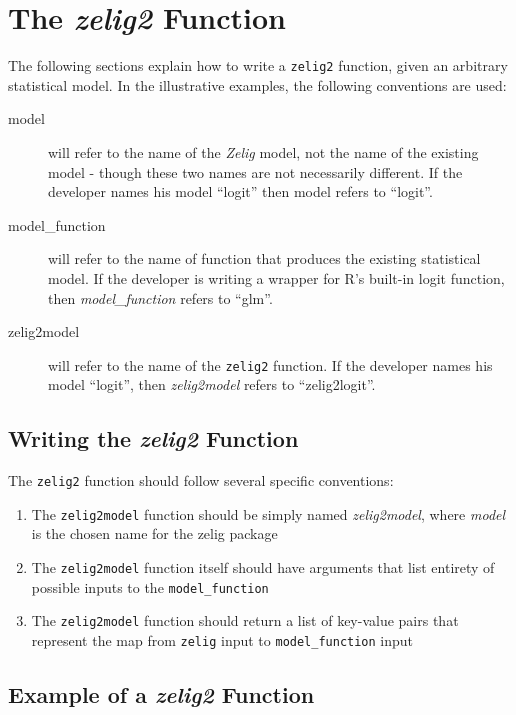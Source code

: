 \documentclass[11pt]{article}
\begin{document}
\section{The \emph{zelig2} Function}
The following sections explain how to write a {\tt zelig2} function, given an arbitrary statistical model.  In the illustrative examples, the following conventions are used:

\begin{description}
	\item[model]{will refer to the name of the \emph{Zelig} model, not the name of the existing model - though these two names are not necessarily different.  If the developer names his model ``logit'' then model refers to ``logit''.}
	\item[model\_function]{will refer to the name of function that produces the existing statistical model.  If the developer is writing a wrapper for R's built-in logit function, then \emph{model\_function} refers to ``glm''.}
	\item[zelig2model]{will refer to the name of the {\tt zelig2} function.  If the developer names his model ``logit'', then \emph{zelig2model} refers to ``zelig2logit''.}
\end{description}


\subsection{Writing the \emph{zelig2} Function}

The {\tt zelig2} function should follow several specific conventions:

\begin{enumerate}
	\item{The {\tt zelig2model} function should be simply named \emph{zelig2model}, where \emph{model} is the chosen name for the zelig package}
	\item{The {\tt zelig2model} function itself should have arguments that list entirety of possible inputs to the {\tt model\_function}}
	\item{The {\tt zelig2model} function should return a list of key-value pairs that represent the map from {\tt zelig} input to {\tt model\_function} input}
\end{enumerate}


\subsection{Example of a \emph{zelig2} Function}
\end{document}
